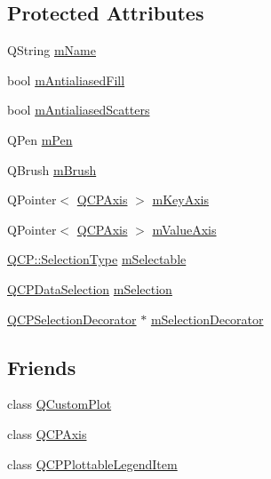 \subsection*{Protected Attributes}
\begin{DoxyCompactItemize}
\item 
Q\+String \mbox{\hyperlink{class_q_c_p_abstract_plottable_ac29ffef424e2488675930de18cde612a}{m\+Name}}
\item 
bool \mbox{\hyperlink{class_q_c_p_abstract_plottable_a152ac765bedf927fb240545d11d453ea}{m\+Antialiased\+Fill}}
\item 
bool \mbox{\hyperlink{class_q_c_p_abstract_plottable_aa115755e525a8e3a86dc683f9cab755b}{m\+Antialiased\+Scatters}}
\item 
Q\+Pen \mbox{\hyperlink{class_q_c_p_abstract_plottable_a67bc0622fd1b9fa14e54c14922dcec66}{m\+Pen}}
\item 
Q\+Brush \mbox{\hyperlink{class_q_c_p_abstract_plottable_a33f00674c0161c13315ab9da0895418e}{m\+Brush}}
\item 
Q\+Pointer$<$ \mbox{\hyperlink{class_q_c_p_axis}{Q\+C\+P\+Axis}} $>$ \mbox{\hyperlink{class_q_c_p_abstract_plottable_a426f42e254d0f8ce5436a868c61a6827}{m\+Key\+Axis}}
\item 
Q\+Pointer$<$ \mbox{\hyperlink{class_q_c_p_axis}{Q\+C\+P\+Axis}} $>$ \mbox{\hyperlink{class_q_c_p_abstract_plottable_a2901452ca4aea911a1827717934a4bda}{m\+Value\+Axis}}
\item 
\mbox{\hyperlink{namespace_q_c_p_ac6cb9db26a564b27feda362a438db038}{Q\+C\+P\+::\+Selection\+Type}} \mbox{\hyperlink{class_q_c_p_abstract_plottable_a3944521f7bec90974737c9d192fc57ba}{m\+Selectable}}
\item 
\mbox{\hyperlink{class_q_c_p_data_selection}{Q\+C\+P\+Data\+Selection}} \mbox{\hyperlink{class_q_c_p_abstract_plottable_a206aa62c9eba32c82e892b29cdbf6314}{m\+Selection}}
\item 
\mbox{\hyperlink{class_q_c_p_selection_decorator}{Q\+C\+P\+Selection\+Decorator}} $\ast$ \mbox{\hyperlink{class_q_c_p_abstract_plottable_a0dbc731cab717f4ff67b4ca100c74046}{m\+Selection\+Decorator}}
\end{DoxyCompactItemize}
\subsection*{Friends}
\begin{DoxyCompactItemize}
\item 
class \mbox{\hyperlink{class_q_c_p_abstract_plottable_a1cdf9df76adcfae45261690aa0ca2198}{Q\+Custom\+Plot}}
\item 
class \mbox{\hyperlink{class_q_c_p_abstract_plottable_af123edeca169ec7a31958a1d714e1a8a}{Q\+C\+P\+Axis}}
\item 
class \mbox{\hyperlink{class_q_c_p_abstract_plottable_a104c78e91302afd6842a903e472f552f}{Q\+C\+P\+Plottable\+Legend\+Item}}
\end{DoxyCompactItemize}


